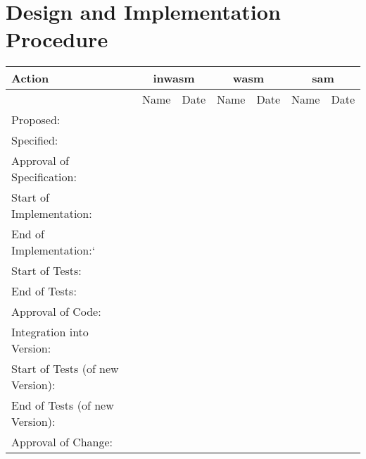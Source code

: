 \section{Design and Implementation Procedure}

\begin{center}
\begin{tabular}{|l||c|c||c|c||c|c||}
\hline\hline
Action & \multicolumn{2}{|c|}{inwasm} &
\multicolumn{2}{|c|}{wasm} & \multicolumn{2}{|c|}{sam}  \\
\hline
& Name & Date & Name & Date & Name & Date \\
\hline\hline
 Proposed:& & & & & & \\
 Specified:& & & & & & \\
 Approval of Specification:& & & & & & \\
 Start of Implementation:& & & & & & \\
 End of Implementation:`& & & & & & \\
 Start of Tests:& & & & & & \\
 End of Tests:& & & & & & \\
 Approval of Code:& & & & & & \\
 Integration into Version: & & & & & & \\
 Start of Tests (of new Version):& & & & & & \\
 End of Tests (of new Version):& & & & & & \\
 Approval of Change:& & & & & & \\
\hline\hline
\end{tabular}
\end{center}


